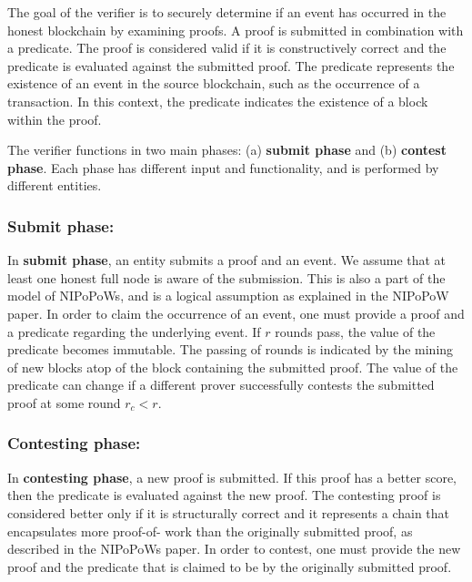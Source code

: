 The goal of the verifier is to securely determine if an event has occurred in
the honest blockchain by examining proofs. A proof is submitted in combination
with a predicate. The proof is considered valid if it is constructively correct
and the predicate is evaluated against the submitted proof. The predicate
represents the existence of an event in the source blockchain, such as the
occurrence of a transaction. In this context, the predicate indicates the
existence of a block within the proof.

The verifier functions in two main phases: (a) \textbf{submit phase} and (b)
\textbf{contest phase}. Each phase has different input and functionality, and
is performed by different entities.

\subsubsection{Submit phase:} In \textbf{submit phase}, an entity submits a
proof and an event. We assume that at least one honest full node is aware of
the submission. This is also a part of the model of NIPoPoWs, and is a logical
assumption as explained in the NIPoPoW paper. In order to claim the occurrence
of an event, one must provide a proof and a predicate regarding the underlying
event.  If $r$ rounds pass, the value of the predicate becomes immutable. The
passing of rounds is indicated by the mining of new blocks atop of the block
containing the submitted proof. The value of the predicate can change if a
different prover successfully contests the submitted proof at some round $r_{c}
< r$.

\subsubsection{Contesting phase:} In \textbf{contesting phase}, a new proof is
submitted. If this proof has a better score, then the predicate is evaluated
against the new proof. The contesting proof is considered better only if it is
structurally correct and it represents a chain that encapsulates more proof-of-
work than the originally submitted proof, as described in the NIPoPoWs paper.
In order to contest, one must provide the new proof and the predicate that is
claimed to be \true by the originally submitted proof.\\

